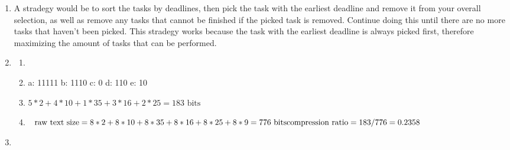\documentclass{article}
\begin{document}
\begin{enumerate}
\item A stradegy would be to sort the tasks by deadlines, then pick the task with the earliest deadline and remove it from your overall selection, as well as remove any tasks that cannot be finished if the picked task is removed. Continue doing this until there are no more tasks that haven't been picked. This stradegy works because the task with the earliest deadline is always picked first, therefore maximizing the amount of tasks that can be performed.
\item \begin{enumerate}
	\item \begin{minipage}[t]{\linewidth}
          \raggedright
	\end{minipage}
	\item a: 11111  b: 1110  c: 0  d: 110  e: 10
	\item \begin{math} 5*2+4*10+1*35+3*16+2*25=183 \mbox{ bits}
		\end{math}
	\item \begin{math} \mbox{raw text size}=8*2+8*10+8*35+8*16+8*25+8*9=776\mbox{ bits}\\
		\mbox{compression ratio}=183/776=0.2358
		\end{math}
	\end{enumerate}
\item \begin{enumerate}

\end{enumerate}
\end{enumerate}
\end{document}
